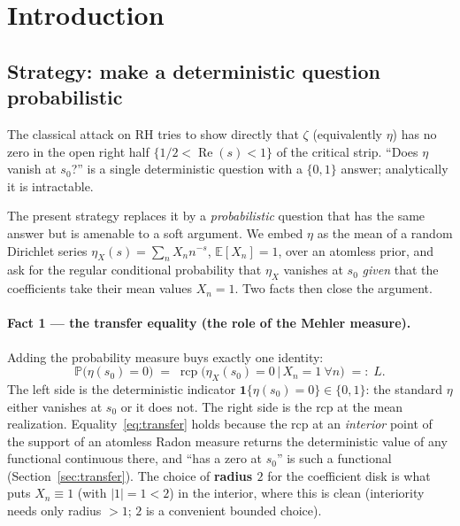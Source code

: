 \documentclass[11pt,a4paper]{article}
\theoremstyle{definition}
\newcommand{\Rea}{\operatorname{Re}}
\newcommand{\etaX}{\eta_X}
\newcommand{\rcp}{\operatorname{rcp}}
\begin{document}
\section{Introduction}

\subsection{Strategy: make a deterministic question probabilistic}

The classical attack on RH tries to show directly that \(\zeta\) (equivalently \(\eta\))
has no zero in the open right half \(\{1/2<\Rea(s)<1\}\) of the critical strip. ``Does
\(\eta\) vanish at \(s_0\)?'' is a single deterministic question with a \(\{0,1\}\)
answer; analytically it is intractable.

The present strategy replaces it by a \emph{probabilistic} question that has the same
answer but is amenable to a soft argument. We embed \(\eta\) as the mean of a random
Dirichlet series \(\etaX(s)=\sum_n X_n n^{-s}\), \(\mathbb{E}[X_n]=1\), over an atomless
prior, and ask for the regular conditional probability that \(\etaX\) vanishes at \(s_0\)
\emph{given} that the coefficients take their mean values \(X_n=1\). Two facts then close
the argument.

\paragraph{Fact 1 --- the transfer equality (the role of the Mehler measure).} Adding the
probability measure buys exactly one identity:
\begin{equation}\label{eq:transfer}
  \mathbb{P}\bigl(\eta(s_0)=0\bigr)
  \;=\;
  \rcp\bigl(\etaX(s_0)=0 \,\big|\, X_n=1\ \forall n\bigr)
  \;=:\;L .
\end{equation}
The left side is the deterministic indicator \(\mathbf{1}\{\eta(s_0)=0\}\in\{0,1\}\): the
standard \(\eta\) either vanishes at \(s_0\) or it does not. The right side is the rcp at
the mean realization. Equality~\eqref{eq:transfer} holds because the rcp at an
\emph{interior} point of the support of an atomless Radon measure returns the
deterministic value of any functional continuous there, and ``has a zero at \(s_0\)'' is
such a functional (Section~\ref{sec:transfer}). The choice of \textbf{radius \(2\)}
for the coefficient disk is what puts \(X_n\equiv1\) (with \(|1|=1<2\)) in the interior, where
this is clean (interiority needs only radius \(>1\); \(2\) is a convenient bounded choice).
\end{document}
